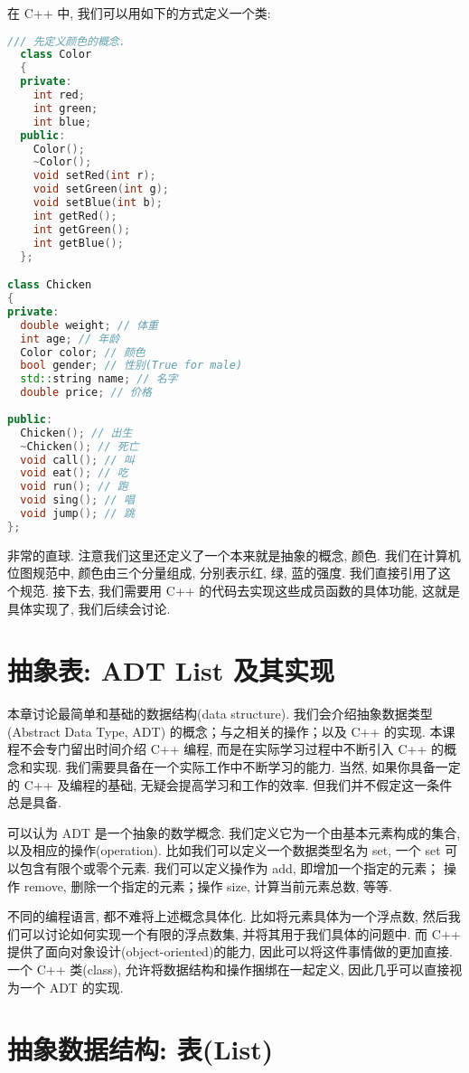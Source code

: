 \documentclass[a4paper]{ctexart}
\theoremstyle{definition}
\theoremstyle{definition}
\begin{document}
在 C++ 中, 我们可以用如下的方式定义一个类:
\begin{lstlisting}[language=C++]
  /// 先定义颜色的概念.
  class Color
  {
  private:
    int red;
    int green;
    int blue;
  public:
    Color();
    ~Color();
    void setRed(int r);
    void setGreen(int g);
    void setBlue(int b);
    int getRed();
    int getGreen();
    int getBlue();
  };  

class Chicken
{
private:
  double weight; // 体重
  int age; // 年龄
  Color color; // 颜色
  bool gender; // 性别(True for male)
  std::string name; // 名字
  double price; // 价格
  
public:
  Chicken(); // 出生
  ~Chicken(); // 死亡
  void call(); // 叫
  void eat(); // 吃
  void run(); // 跑
  void sing(); // 唱
  void jump(); // 跳
};
\end{lstlisting}
非常的直球. 注意我们这里还定义了一个本来就是抽象的概念, 颜色. 我们在计算机位图规范中, 
颜色由三个分量组成, 分别表示红, 绿, 蓝的强度. 我们直接引用了这个规范. 接下去, 我们需要用 C++ 的代码去实现这些成员函数的具体功能, 
这就是具体实现了, 我们后续会讨论. 


\section{抽象表: ADT List 及其实现}
本章讨论最简单和基础的数据结构(data structure). 我们会介绍抽象数据类型
(Abstract Data Type, ADT) 的概念；与之相关的操作；以及 C++ 的实现.
本课程不会专门留出时间介绍 C++ 编程, 而是在实际学习过程中不断引入 C++
的概念和实现. 我们需要具备在一个实际工作中不断学习的能力. 当然, 如果你具备一定的
C++ 及编程的基础, 无疑会提高学习和工作的效率. 但我们并不假定这一条件总是具备.

可以认为 ADT 是一个抽象的数学概念. 我们定义它为一个由基本元素构成的集合,
以及相应的操作(operation). 比如我们可以定义一个数据类型名为 set,
一个 set 可以包含有限个或零个元素. 我们可以定义操作为 add, 即增加一个指定的元素；
操作 remove, 删除一个指定的元素；操作 size, 计算当前元素总数, 等等.

不同的编程语言, 都不难将上述概念具体化. 比如将元素具体为一个浮点数,
然后我们可以讨论如何实现一个有限的浮点数集, 并将其用于我们具体的问题中. 而 C++
提供了面向对象设计(object-oriented)的能力, 因此可以将这件事情做的更加直接. 一个
C++ 类(class), 允许将数据结构和操作捆绑在一起定义, 因此几乎可以直接视为一个 ADT
的实现.

\section{抽象数据结构: 表(List)}
\end{document}
